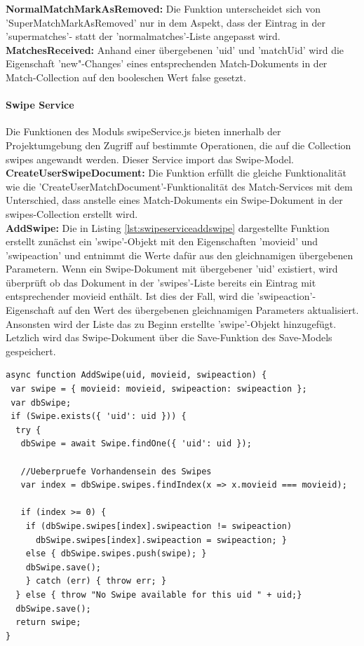 \noindent
\textbf{NormalMatchMarkAsRemoved:}
Die Funktion unterscheidet sich von 'SuperMatchMarkAsRemoved' nur in dem Aspekt, dass der  Eintrag in der 'supermatches'- statt der 'normalmatches'-Liste angepasst wird.\\

\noindent
\textbf{MatchesReceived:}
Anhand einer übergebenen 'uid' und 'matchUid' wird die Eigenschaft 'new"-Changes' eines entsprechenden Match-Dokuments in der Match-Collection auf den booleschen Wert false gesetzt. 



%
%

\paragraph{Swipe Service}
Die Funktionen des Moduls swipeService.js bieten innerhalb der Projektumgebung den Zugriff auf bestimmte Operationen, die auf die Collection swipes angewandt werden. Dieser Service import das Swipe-Model.\\

\noindent
\textbf{CreateUserSwipeDocument:}
Die Funktion erfüllt die gleiche Funktionalität wie die 'Create\-UserMatchDocument'-Funktionalität des Match-Services mit dem Unterschied, dass anstelle eines Match-Dokuments ein Swipe-Dokument in der swipes-Collection erstellt wird.\\

\noindent
\textbf{AddSwipe:}
Die in Listing \ref{lst:swipeserviceaddswipe} dargestellte Funktion erstellt zunächst ein 'swipe'-Objekt mit den Eigenschaften 'movieid' und 'swipeaction' und entnimmt die Werte dafür aus den gleichnamigen übergebenen Parametern. 
Wenn ein Swipe-Dokument mit übergebener 'uid' existiert, wird überprüft ob das Dokument in der 'swipes'-Liste bereits ein Eintrag mit entsprechender movieid enthält. Ist dies der Fall, wird die 'swipeaction'-Eigenschaft auf den Wert des übergebenen gleichnamigen Parameters aktualisiert. Ansonsten wird der Liste das zu Beginn erstellte 'swipe'-Objekt hinzugefügt. Letzlich wird das Swipe-Dokument über die Save-Funktion des Save-Models gespeichert.\\

\begin{lstlisting}[caption=Swipe Service - AddSwipe, label=lst:swipeserviceaddswipe]
async function AddSwipe(uid, movieid, swipeaction) {
 var swipe = { movieid: movieid, swipeaction: swipeaction };
 var dbSwipe;
 if (Swipe.exists({ 'uid': uid })) {
  try {
   dbSwipe = await Swipe.findOne({ 'uid': uid });

   //Ueberpruefe Vorhandensein des Swipes
   var index = dbSwipe.swipes.findIndex(x => x.movieid === movieid);

   if (index >= 0) {
    if (dbSwipe.swipes[index].swipeaction != swipeaction)
      dbSwipe.swipes[index].swipeaction = swipeaction; }
    else { dbSwipe.swipes.push(swipe); }
    dbSwipe.save(); 
    } catch (err) { throw err; }
  } else { throw "No Swipe available for this uid " + uid;}
  dbSwipe.save();
  return swipe;
}
\end{lstlisting}

